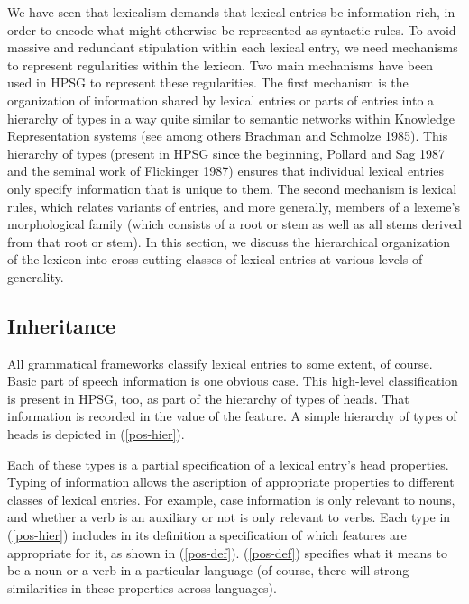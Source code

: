 \documentclass[output=paper]{langsci/langscibook}
\begin{document}
We have seen that lexicalism demands that lexical entries be information rich, in order to encode what might otherwise be represented as syntactic rules.
To avoid massive and redundant stipulation within each lexical entry, we need mechanisms to represent regularities within the lexicon. Two main mechanisms have been used in HPSG to represent these regularities. The first mechanism is the organization of information shared by lexical entries or parts of entries into a hierarchy of types in a way quite similar to semantic networks within Knowledge Representation systems (see among others Brachman and Schmolze 1985). This hierarchy of types (present in HPSG since the beginning, Pollard and Sag 1987 and the seminal work of Flickinger 1987) ensures that individual lexical entries only specify information that is unique to them. The second mechanism is lexical rules, which relates variants of entries, and more generally, members of a lexeme's morphological family (which consists of a root or stem as well as all stems derived from that root or stem).     
In this section, we discuss the hierarchical organization of the lexicon into cross-cutting classes of lexical entries at various levels of generality.

	\subsection{Inheritance}

All grammatical frameworks classify lexical entries to some extent, of course.
Basic part of speech information is one obvious case.
This high-level classification is present in HPSG, too, as part of the hierarchy of types of heads. That information is recorded in the value of the  feature. A simple hierarchy of types of heads is depicted in (\ref{pos-hier}).

\begin{exe}
        \ex\label{pos-hier}
\end{exe}

Each of these types is a partial specification of a lexical entry's head properties. Typing of  information allows the ascription of appropriate properties to different classes of lexical entries. For example, case information is only relevant to nouns, and whether a verb is an auxiliary or not is only relevant to verbs. Each type in (\ref{pos-hier}) includes in its definition a specification of which features are appropriate for it, as shown in (\ref{pos-def}). (\ref{pos-def}) specifies what it means to be a noun or a verb in a particular language (of course, there will strong similarities in these properties across languages). 
\end{document}
